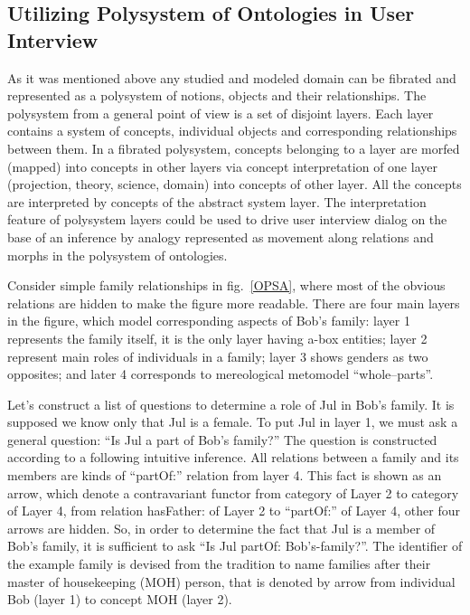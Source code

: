 \documentclass[utf8]{../IncArticle}
\begin{document}
\subsection{Utilizing Polysystem of Ontologies in User Interview}
As it was mentioned above any studied and modeled domain can be fibrated and represented as a polysystem of notions, objects and their relationships.  The polysystem from a general point of view is a set of disjoint layers.  Each layer contains a system of concepts, individual objects and corresponding relationships between them.  In a fibrated polysystem, concepts belonging to a layer are morfed (mapped) into concepts in other layers via concept interpretation of one layer (projection, theory, science, domain) into concepts of other layer.  All the concepts are interpreted by concepts of the abstract system layer.  The interpretation feature of polysystem layers could be used to drive user interview dialog on the base of an inference by analogy represented as movement along relations and morphs in the polysystem of ontologies.

Consider simple family relationships in fig.~\ref{OPSA}, where most of the obvious relations are hidden to make the figure more readable.  There are four main layers in the figure, which model corresponding aspects of Bob's family: layer 1 represents the family itself, it is the only layer having a-box entities; layer 2 represent main roles of individuals in a family; layer 3 shows genders as two opposites; and later 4 corresponds to mereological metomodel ``whole--parts''.

Let's construct a list of questions to determine a role of Jul in Bob's family.  It is supposed we know only that Jul is a female.  To put Jul in layer 1, we must ask a general question: ``Is Jul a part of Bob's family?'' The question is constructed according to a following intuitive inference.  All relations between a family and its members are kinds of ``partOf:'' relation from layer 4.  This fact is shown as an arrow, which denote a contravariant functor from category of Layer 2 to category of Layer 4, from relation hasFather: of Layer 2 to ``partOf:'' of Layer 4, other four arrows are hidden.  So, in order to determine the fact that Jul is a member of Bob's family, it is sufficient to ask ``Is Jul partOf: Bob's-family?''.  The identifier of the example family is devised from the tradition to name families after their master of housekeeping (MOH) person, that is denoted by arrow from individual Bob (layer 1) to concept MOH (layer 2).
\end{document}

